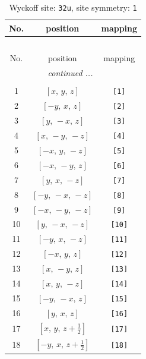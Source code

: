 \documentclass[fleqn,8pt]{jsarticle}
\begin{document}
\renewcommand{\arraystretch}{1.2}
\begin{longtable}{ccc}
\caption{Wyckoff site: {\tt 32u}, site symmetry: {\tt 1}}
 \\
 \hline \hline
No. & position & mapping \\ \hline \endfirsthead

\multicolumn{2}{l}{\tablename\ \thetable{}} \\
 \hline \hline
No. & position & mapping \\ \hline \endhead

 \hline \hline
\multicolumn{2}{r}{\footnotesize\it continued ...} \\ \endfoot

 \hline \hline
\multicolumn{2}{r}{} \\ \endlastfoot

1 & $\left[ x,\, y,\, z \right]$ & {\tt [1]} \\ \hline
2 & $\left[ - y,\, x,\, z \right]$ & {\tt [2]} \\ \hline
3 & $\left[ y,\, - x,\, z \right]$ & {\tt [3]} \\ \hline
4 & $\left[ x,\, - y,\, - z \right]$ & {\tt [4]} \\ \hline
5 & $\left[ - x,\, y,\, - z \right]$ & {\tt [5]} \\ \hline
6 & $\left[ - x,\, - y,\, z \right]$ & {\tt [6]} \\ \hline
7 & $\left[ y,\, x,\, - z \right]$ & {\tt [7]} \\ \hline
8 & $\left[ - y,\, - x,\, - z \right]$ & {\tt [8]} \\ \hline
9 & $\left[ - x,\, - y,\, - z \right]$ & {\tt [9]} \\ \hline
10 & $\left[ y,\, - x,\, - z \right]$ & {\tt [10]} \\ \hline
11 & $\left[ - y,\, x,\, - z \right]$ & {\tt [11]} \\ \hline
12 & $\left[ - x,\, y,\, z \right]$ & {\tt [12]} \\ \hline
13 & $\left[ x,\, - y,\, z \right]$ & {\tt [13]} \\ \hline
14 & $\left[ x,\, y,\, - z \right]$ & {\tt [14]} \\ \hline
15 & $\left[ - y,\, - x,\, z \right]$ & {\tt [15]} \\ \hline
16 & $\left[ y,\, x,\, z \right]$ & {\tt [16]} \\ \hline
17 & $\left[ x,\, y,\, z + \frac{1}{2} \right]$ & {\tt [17]} \\ \hline
18 & $\left[ - y,\, x,\, z + \frac{1}{2} \right]$ & {\tt [18]} \\ \hline

\end{longtable}
\end{document}
